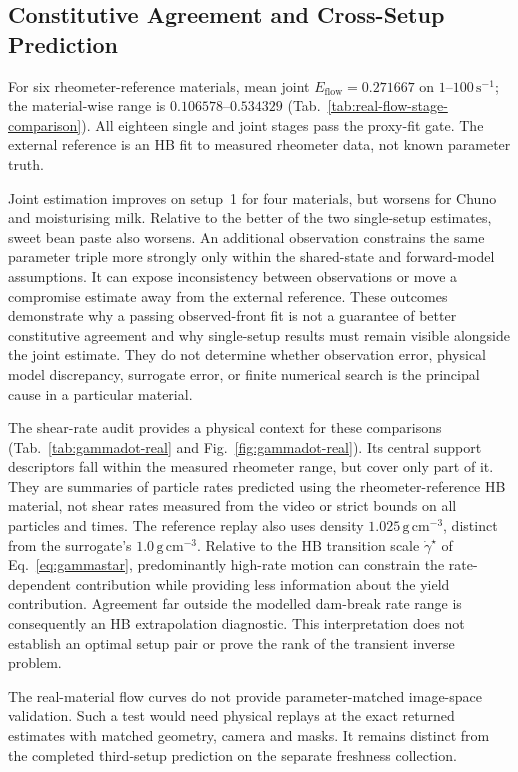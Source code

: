 \subsection{Constitutive Agreement and Cross-Setup Prediction}

For six rheometer-reference materials, mean joint
$E_{\mathrm{flow}}=0.271667$ on $1$--$100\,\mathrm{s}^{-1}$;
the material-wise range is $0.106578$--$0.534329$
(Tab.~\ref{tab:real-flow-stage-comparison}). All eighteen single and
joint stages pass the proxy-fit gate. The external reference is an
HB fit to measured rheometer data, not known parameter truth.

Joint estimation improves on setup~1 for four materials, but worsens
for Chuno and moisturising milk. Relative to the better of the two
single-setup estimates, sweet bean paste also worsens. An additional
observation constrains the same parameter triple more strongly only
within the shared-state and forward-model assumptions. It can expose
inconsistency between observations or move a compromise estimate away
from the external reference. These outcomes demonstrate why a passing
observed-front fit is not a guarantee of better constitutive agreement
and why single-setup results must remain visible alongside the joint
estimate. They do not determine whether observation error, physical
model discrepancy, surrogate error, or finite numerical search is the
principal cause in a particular material.

The shear-rate audit provides a physical context for these comparisons
(Tab.~\ref{tab:gammadot-real} and Fig.~\ref{fig:gammadot-real}). Its
central support descriptors fall within the measured rheometer range,
but cover only part of it. They are summaries of particle rates
predicted using the rheometer-reference HB material, not shear rates
measured from the video or strict bounds on all particles and times.
The reference replay also uses density
$1.025\,\mathrm{g\,cm}^{-3}$, distinct from the surrogate's
$1.0\,\mathrm{g\,cm}^{-3}$. Relative to the HB transition scale
$\dot\gamma^\star$ of Eq.~\eqref{eq:gammastar}, predominantly high-rate
motion can constrain the rate-dependent contribution while providing
less information about the yield contribution. Agreement far outside
the modelled dam-break rate range is consequently an HB extrapolation
diagnostic. This interpretation does not establish an optimal setup
pair or prove the rank of the transient inverse problem.

The real-material flow curves do not provide parameter-matched
image-space validation. Such a test would need physical replays at
the exact returned estimates with matched geometry, camera and masks.
It remains distinct from the completed third-setup prediction on the
separate freshness collection.

